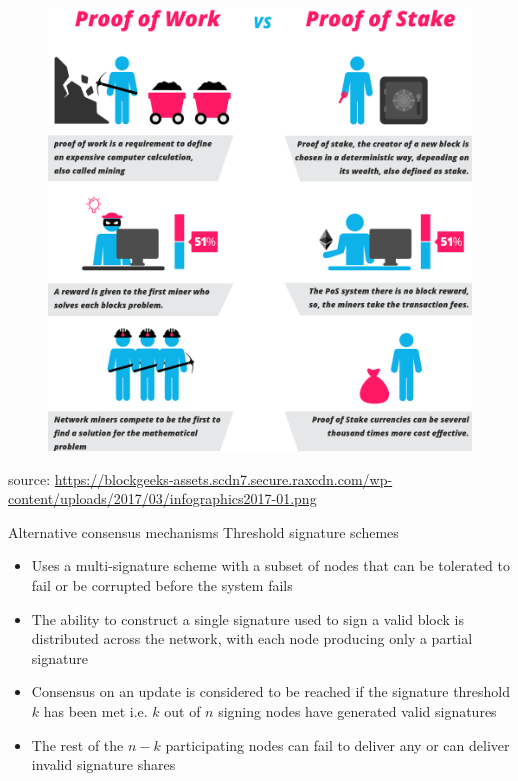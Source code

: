 \documentclass[11pt]{beamer}
\begin{document}
\begin{frame}
	\begin{figure}[]
		\centering
		\includegraphics  [scale=0.15]{Images/vs}
	\end{figure}
	\begin{scriptsize}
		source: \href{https://blockgeeks.com/guides/proof-of-work-vs-proof-of-stake/}{https://blockgeeks-assets.scdn7.secure.raxcdn.com/wp-content/uploads/2017/03/infographics2017-01.png}
	\end{scriptsize}
\end{frame}


\begin{frame}{Alternative consensus mechanisms}
	Threshold signature schemes
	\begin{itemize}
		\item Uses a multi-signature scheme with a subset of nodes that can be tolerated to fail or be corrupted before the system fails
		\item The ability to construct a single signature used to sign a valid block is distributed across the network, with each node producing only a partial signature
		\item Consensus on an update is considered to be reached if the signature threshold $k$ has been met i.e.  $k$ out of $n$ signing nodes have generated valid signatures
		\item The rest of the $n-k$ participating nodes can fail to deliver any or can deliver invalid signature shares
	\end{itemize}
\end{frame}
\end{document}
